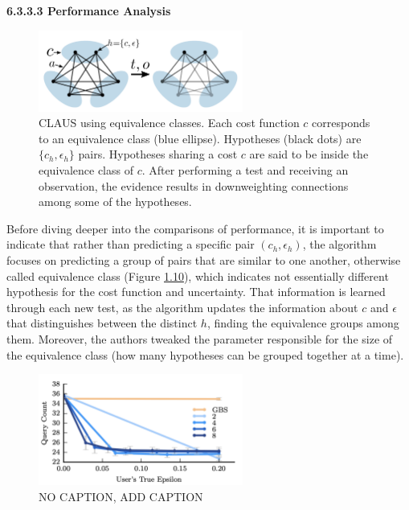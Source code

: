 \documentclass[
  letterpaper,
  DIV=11,
  numbers=noendperiod,
  oneside]{scrreprt}
\theoremstyle{remark}
\begin{document}
\textbf{6.3.3.3 Performance Analysis}

\begin{figure}

{\centering \includegraphics[width=0.6\textwidth,height=\textheight]{src/Figures/equiv.png}

}

\caption{CLAUS using equivalence classes. Each cost function \(c\)
corresponds to an equivalence class (blue ellipse). Hypotheses (black
dots) are \(\{c_h,\epsilon_h\}\) pairs. Hypotheses sharing a cost \(c\)
are said to be inside the equivalence class of \(c\). After performing a
test and receiving an observation, the evidence results in downweighting
connections among some of the hypotheses.}

\end{figure}%

Before diving deeper into the comparisons of performance, it is
important to indicate that rather than predicting a specific pair
\((c_h, \epsilon_h)\), the algorithm focuses on predicting a group of
pairs that are similar to one another, otherwise called equivalence
class (Figure \hyperref[fig:equiv_c]{1.10}), which indicates not
essentially different hypothesis for the cost function and uncertainty.
That information is learned through each new test, as the algorithm
updates the information about \(c\) and \(\epsilon\) that distinguishes
between the distinct \(h\), finding the equivalence groups among them.
Moreover, the authors tweaked the parameter responsible for the size of
the equivalence class (how many hypotheses can be grouped together at a
time).

\begin{figure}

{\centering \includegraphics[width=0.6\textwidth,height=\textheight]{src/Figures/GBS:CLAUS.png}

}

\caption{NO CAPTION, ADD CAPTION}

\end{figure}%
\end{document}
